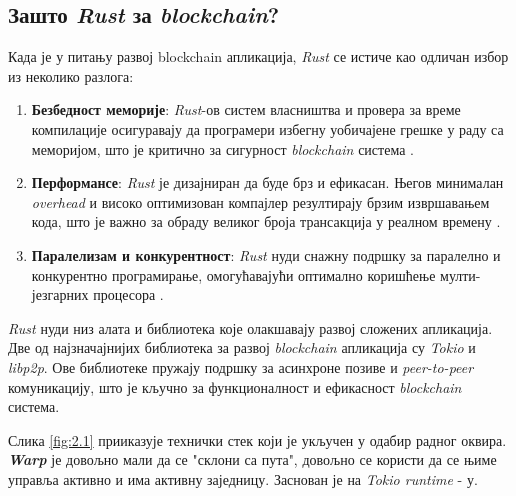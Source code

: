 \documentclass[12pt, a4paper]{article}
\begin{document}
\subsection{Зашто \textit{Rust} за \textit{blockchain}?}
Када је у питању развој blockchain апликација, \textit{Rust} се истиче као одличан избор из неколико разлога:
\begin{enumerate}
    \item \textbf{Безбедност меморије}: \textit{Rust}-ов систем власништва и провера за време компилације осигуравају да програмери избегну уобичајене грешке у раду са меморијом, што је критично за сигурност \textit{blockchain} система \cite{7}.
    \item \textbf{Перформансе}: \textit{Rust} је дизајниран да буде брз и ефикасан. Његов минималан \textit{overhead} и високо оптимизован компајлер резултирају брзим извршавањем кода, што је важно за обраду великог броја трансакција у реалном времену \cite{7}.
    \item \textbf{Паралелизам и конкурентност}: \textit{Rust} нуди снажну подршку за паралелно и конкурентно програмирање, омогућавајући оптимално коришћење мулти-језгарних процесора \cite{7}.
\end{enumerate}

\textit{Rust} нуди низ алата и библиотека које олакшавају развој сложених апликација. Две од најзначајнијих библиотека за развој \textit{blockchain} апликација су \textit{Tokio} и \textit{libp2p}. Ове библиотеке пружају подршку за асинхроне позиве и \textit{peer-to-peer} комуникацију, што је кључно за функционалност и ефикасност \textit{blockchain} система.

\pagebreak


Слика \ref{fig:2.1} прииказује технички стек који је укључен у одабир радног оквира. \textbf{\textit{Warp}} је довољно мали да се "склони са пута", довољно се користи да се њиме управља активно и има активну заједницу. Заснован је на \textit{Tokio runtime} - у. 
\end{document}

